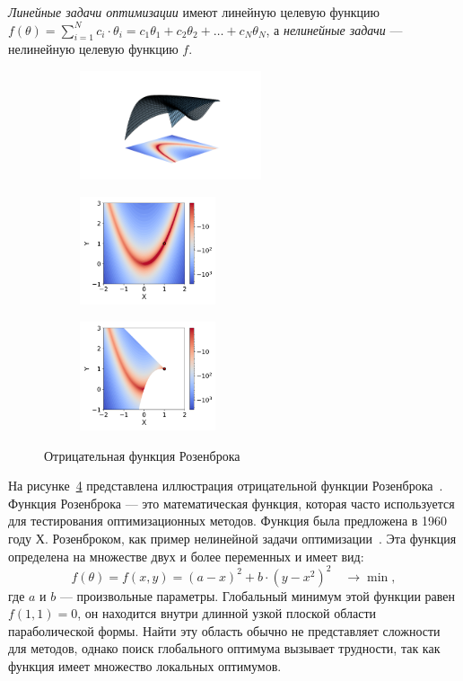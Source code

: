 \emph{Линейные задачи оптимизации} имеют линейную целевую функцию $f(\theta) = \sum_{i=1}^N c_i \cdot \theta_i = c_1 \theta_1 + c_2 \theta_2 + \dots + c_N \theta_N$, а \emph{нелинейные задачи} --- нелинейную целевую функцию $f$.

\begin{figure}[t]
    \begin{subfigure}[b]{.35\textwidth}
    \includegraphics[height=3.2cm]{images/part1/opt/rosenbrock_3d_orig.png}
    \caption{}
    \label{fig:part1:opt:rosenbrock_3d}
    \end{subfigure}%
    \begin{subfigure}[b]{.32\textwidth}
    \includegraphics[height=3.2cm]{images/part1/opt/rosenbrock_unconstr.png}
    \caption{}
    \label{fig:part1:opt:rosenbrock_unconstr}
    \end{subfigure}%
    \begin{subfigure}[b]{.32\textwidth}
    \includegraphics[height=3.2cm]{images/part1/opt/rosenbrock_constr.png}
    \caption{}
    \label{fig:part1:opt:rosenbrock_constr}
    \end{subfigure}
    \caption{Отрицательная функция Розенброка~\cite{rosenbrock1960automatic}}\label{fig:part1:opt:rosenbrock}
\end{figure}

На рисунке~\ref{fig:part1:opt:rosenbrock} представлена иллюстрация отрицательной функции Розенброка~\cite{rosenbrock1960automatic}.
Функция Розенброка --- это математическая функция, которая часто используется для тестирования оптимизационных методов.
Функция была предложена в 1960 году Х. Розенброком, как пример нелинейной задачи оптимизации~\cite{rosenbrock1960automatic}.
Эта функция определена на множестве двух и более переменных и имеет вид:
$$f(\theta) = f(x, y) = (a - x)^2 + b\cdot(y - x^2)^2 \quad \to \min,$$
где $a$ и $b$ --- произвольные параметры.
Глобальный минимум этой функции равен $f(1, 1) = 0$, он находится внутри длинной узкой плоской области параболической формы.
Найти эту область обычно не представляет сложности для методов, однако поиск глобального оптимума вызывает трудности, так как функция имеет множество локальных оптимумов.

